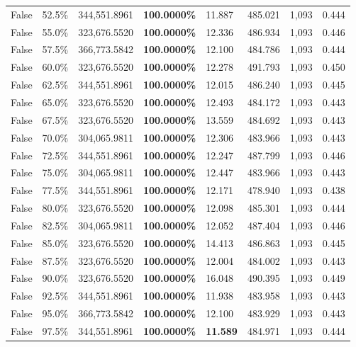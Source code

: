 \begin{table}[H]
\begin{tabular}{lllrllll}
\cline{1-8}
False & 52.5\% & 344,551.8961 & \bfseries \color{red} 100.0000\% & 11.887 & 485.021 & 1,093 & 0.444 \\
\cline{1-8}
False & 55.0\% & 323,676.5520 & \bfseries \color{red} 100.0000\% & 12.336 & 486.934 & 1,093 & 0.446 \\
\cline{1-8}
False & 57.5\% & 366,773.5842 & \bfseries \color{red} 100.0000\% & 12.100 & 484.786 & 1,093 & 0.444 \\
\cline{1-8}
False & 60.0\% & 323,676.5520 & \bfseries \color{red} 100.0000\% & 12.278 & 491.793 & 1,093 & 0.450 \\
\cline{1-8}
False & 62.5\% & 344,551.8961 & \bfseries \color{red} 100.0000\% & 12.015 & 486.240 & 1,093 & 0.445 \\
\cline{1-8}
False & 65.0\% & 323,676.5520 & \bfseries \color{red} 100.0000\% & 12.493 & 484.172 & 1,093 & 0.443 \\
\cline{1-8}
False & 67.5\% & 323,676.5520 & \bfseries \color{red} 100.0000\% & 13.559 & 484.692 & 1,093 & 0.443 \\
\cline{1-8}
False & 70.0\% & \color{red} 304,065.9811 & \bfseries \color{red} 100.0000\% & 12.306 & 483.966 & 1,093 & 0.443 \\
\cline{1-8}
False & 72.5\% & 344,551.8961 & \bfseries \color{red} 100.0000\% & 12.247 & 487.799 & 1,093 & 0.446 \\
\cline{1-8}
False & 75.0\% & \color{red} 304,065.9811 & \bfseries \color{red} 100.0000\% & 12.447 & 483.966 & 1,093 & 0.443 \\
\cline{1-8}
False & 77.5\% & 344,551.8961 & \bfseries \color{red} 100.0000\% & 12.171 & 478.940 & 1,093 & 0.438 \\
\cline{1-8}
False & 80.0\% & 323,676.5520 & \bfseries \color{red} 100.0000\% & 12.098 & 485.301 & 1,093 & 0.444 \\
\cline{1-8}
False & 82.5\% & \color{red} 304,065.9811 & \bfseries \color{red} 100.0000\% & 12.052 & 487.404 & 1,093 & 0.446 \\
\cline{1-8}
False & 85.0\% & 323,676.5520 & \bfseries \color{red} 100.0000\% & 14.413 & 486.863 & 1,093 & 0.445 \\
\cline{1-8}
False & 87.5\% & 323,676.5520 & \bfseries \color{red} 100.0000\% & 12.004 & 484.002 & 1,093 & 0.443 \\
\cline{1-8}
False & 90.0\% & 323,676.5520 & \bfseries \color{red} 100.0000\% & 16.048 & 490.395 & 1,093 & 0.449 \\
\cline{1-8}
False & 92.5\% & 344,551.8961 & \bfseries \color{red} 100.0000\% & 11.938 & 483.958 & 1,093 & 0.443 \\
\cline{1-8}
False & 95.0\% & 366,773.5842 & \bfseries \color{red} 100.0000\% & 12.100 & 483.929 & 1,093 & 0.443 \\
\cline{1-8}
False & 97.5\% & 344,551.8961 & \bfseries \color{red} 100.0000\% & \bfseries \color{red} 11.589 & 484.971 & 1,093 & 0.444 \\
\cline{1-8}
\bottomrule
\end{tabular}
\end{table}
